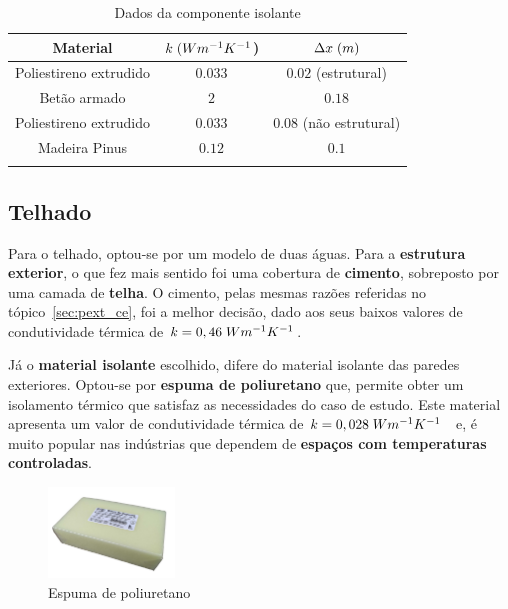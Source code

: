 \documentclass[12pt, a4paper]{article}
\begin{document}
\begin{table}[htpb]
    \begin{center}
        \begin{tabular}{c c c}
            \toprule{}
            Material & $ k \hspace{1mm} (Wm^{-1}K^{-1}$) & $ \Delta x \hspace{1mm} (m)$ \\
            \midrule{}
            Poliestireno extrudido & $0.033$ & $0.02$ (estrutural) \\
            \midrule{}
            Bet\~ao armado & $2$ & $0.18$ \\
            \midrule{}
            Poliestireno extrudido & $0.033$ & $0.08$ (n\~ao estrutural) \\
            \midrule{}
            Madeira Pinus & $0.12$ & $0.1$ \\
            \bottomrule{}
        \end{tabular}
    \end{center}
    \caption{Dados da componente isolante}\label{tab:parede_int_iso}
\end{table}



\pagebreak
\subsection{Telhado}\label{sub:Telhado}

Para o telhado, optou-se por um modelo de duas águas. Para a \textbf{estrutura exterior}, o que fez mais sentido foi
uma cobertura de \textbf{cimento}, sobreposto por uma camada de \textbf{telha}. O cimento, pelas mesmas razões referidas no tópico~\ref{sec:pext_ce}, foi a melhor decisão, dado aos seus baixos valores de condutividade térmica de $k=0,46 \hspace{1mm} Wm^{-1}K^{-1}$.

Já o \textbf{material isolante} escolhido, difere do material isolante das paredes exteriores. Optou-se
por \textbf{espuma de poliuretano} que, permite obter um isolamento térmico que satisfaz as necessidades
do caso de estudo. Este material apresenta um valor de condutividade térmica de
$k=0,028 \hspace{1mm} Wm^{-1}K^{-1}$~\cite{poliuretano} e, é muito popular nas indústrias que dependem de \textbf{espaços
	com temperaturas controladas}.

\begin{figure}[htpb]
	\centering
	\includegraphics[width=0.3\textwidth]{espuma_poliuretano.jpg}
	\caption{Espuma de poliuretano}\label{fig:poliuretano}
\end{figure}
\end{document}
